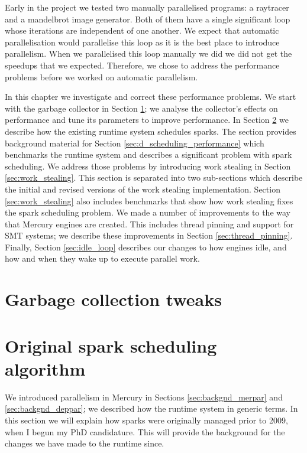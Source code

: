 

Early in the project
we tested two manually parallelised programs:
a raytracer and a mandelbrot image generator.
Both of them have a single significant loop
whose iterations are independent of one another.
We expect that automatic parallelisation would parallelise this loop
as it is the best place to introduce parallelism.
When we parallelised this loop manually we did
we did not get the speedups that we expected.
Therefore,
we chose to address the performance problems
before we worked on automatic parallelism.

In this chapter we investigate and correct these performance problems.
We start with the garbage collector in Section \ref{sec:gc};
we analyse the collector's effects on performance and tune its parameters
to improve performance.
In Section \ref{sec:original_scheduling} we describe how the existing runtime
system schedules sparks.
The section provides background material for Section
\ref{sec:d_scheduling_performance}
which benchmarks the runtime system and describes a significant problem with
spark scheduling.
We address those problems by introducing work stealing in Section
\ref{sec:work_stealing}.
This section is separated into two sub-sections
which describe the initial and revised versions of the work stealing
implementation.
Section \ref{sec:work_stealing} also includes benchmarks that show
how work stealing fixes the spark scheduling problem.
We made a number of improvements to the way that Mercury engines are created.
This includes thread pinning and support for SMT systems;
we describe these improvements in Section \ref{sec:thread_pinning}.
Finally, Section \ref{sec:idle_loop} describes our changes to how engines
idle,
and how and when they wake up to execute parallel work.

\section{Garbage collection tweaks}
\label{sec:gc}




\section{Original spark scheduling algorithm}
\label{sec:original_scheduling}

We introduced parallelism in Mercury in Sections \ref{sec:backgnd_merpar} and
\ref{sec:backgnd_deppar};
we described how the runtime system in generic terms.
In this section we will explain how sparks were originally managed
prior to 2009,
when I begun my PhD candidature.
This will provide the background for the changes we have made to the
runtime since.

